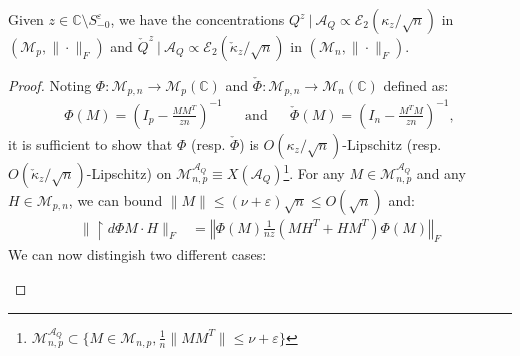 \documentclass[a4papaer, titlepage]{book}
\begin{document}
\begin{proposition}\label{pro:concentration_resolvente_1}
  Given $z \in \mathbb C \setminus S_{-0}^\varepsilon$, we have the concentrations $Q^z \ | \ \mathcal A_Q \propto \mathcal E_2 (\kappa_z/\sqrt n)$ in $(\mathcal M_{p}, \|\cdot \|_F)$ and $\check Q^z \ | \ \mathcal A_Q \propto \mathcal E_2 (\check\kappa_z/\sqrt n)$ in $(\mathcal M_{n}, \|\cdot \|_F)$.
\end{proposition}
\begin{proof}
  Noting $\Phi : \mathcal M_{p,n} \to \mathcal M_{p}(\mathbb C)$ and $\check\Phi: \mathcal M_{p,n} \to \mathcal M_{n}(\mathbb C)$ defined as:
  \begin{align*}
     \Phi(M) =  \left(I_p - \frac{MM^T}{zn}\right)^{-1}&
     &\text{and}&
     &\check \Phi(M) =  \left(I_n - \frac{M^TM}{zn}\right)^{-1},
   \end{align*}
   it is sufficient to show that $\Phi$ (resp. $\check \Phi$) is $O(\kappa_z/\sqrt n)$-Lipschitz (resp. $O(\check\kappa_z/\sqrt n)$-Lipschitz) on $\mathcal M_{n,p}^{\mathcal A_Q} \equiv X(\mathcal A_Q)$\footnote{$\mathcal M_{n,p}^{\mathcal A_Q} \subset \{ M \in \mathcal M_{n,p}, \frac{1}{n}\|MM^T\| \leq \nu+\varepsilon \}$}. For any $M \in \mathcal M_{n,p}^{\mathcal A_Q}$ and any $H \in \mathcal M_{p,n}$, we can bound $\|M\|\leq (\nu + \varepsilon) \sqrt n \leq O(\sqrt n)$ and:
  \begin{align*}
    \|\restriction{d\Phi }{M} \cdot H\|_F 
    &= \left\Vert \Phi \left(M\right)\frac{1}{nz}(MH^T + HM^T) \Phi \left(M\right)\right\Vert_F
  \end{align*}
  We can now distingish two different cases:
  \begin{itemize}

\end{itemize}
\end{proof}
\end{document}
